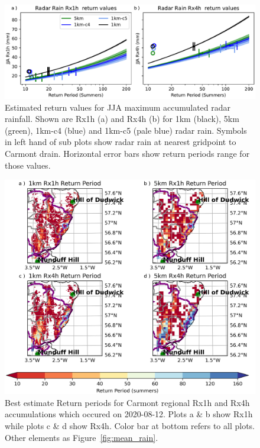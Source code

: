 \documentclass[11pt,a4paper]{article}
\begin{document}
\begin{figure}
	\centering
	\includegraphics[width=\linewidth]{radar_return_prds}
	\caption{Estimated return values for  JJA maximum accumulated radar rainfall. Shown are Rx1h (a) and Rx4h (b) for 1km  (black),  5km (green), 1km-c4 (blue) and 1km-c5 (pale blue) radar rain. Symbols in left hand of sub plots show radar rain at nearest gridpoint to Carmont drain. Horizontal error bars show return periods range for those values. }
	\label{fig:radar_rtn_prd}
\end{figure}
\afterpage{\FloatBarrier}
\begin{figure}
	\centering
	\includegraphics[width=\linewidth]{map_return_prds}
	\caption{Best estimate Return periods for Carmont regional Rx1h and Rx4h accumulations which occured on 2020-08-12. Plots a \& b show Rx1h while plots c \& d show Rx4h. Color bar at bottom refers to all plots. Other elements as Figure~\ref{fig:mean_rain}. } 
	\label{fig:map_rtn_prd}
\end{figure}
\afterpage{\FloatBarrier}
\end{document}
